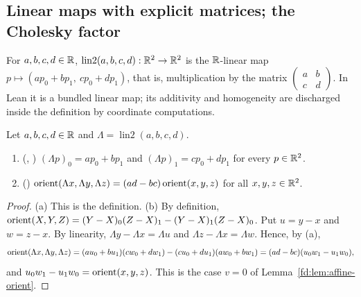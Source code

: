 \subsection{Linear maps with explicit matrices; the Cholesky factor}

\begin{definition}\label{ar:def:lin2}
For $a,b,c,d\in\mathbb R$, $\operatorname{lin2}(a,b,c,d):\mathbb R^2\to\mathbb R^2$ is the $\mathbb R$-linear map
$p\mapsto(ap_0+bp_1,\ cp_0+dp_1)$, that is, multiplication by the matrix
$\begin{pmatrix}a&b\\c&d\end{pmatrix}$. In Lean it is a bundled linear map; its additivity and homogeneity are
discharged inside the definition by coordinate computations.
\end{definition}

\begin{lemma}\label{ar:lem:lin2}
Let $a,b,c,d\in\mathbb R$ and $\Lambda=\operatorname{lin2}(a,b,c,d)$.
\begin{enumerate}[label=\textup{(\alph*)}]
\item \textup{(}, \textup{)} $(\Lambda p)_0=ap_0+bp_1$ and $(\Lambda p)_1=cp_0+dp_1$ for
every $p\in\mathbb R^2$.
\item \textup{(}\textup{)} $\operatorname{orient}(\Lambda x,\Lambda y,\Lambda z)=(ad-bc)\operatorname{orient}(x,y,z)$ for all
$x,y,z\in\mathbb R^2$.
\end{enumerate}
\end{lemma}

\begin{proof}
(a) This is the definition. (b) By definition, $\operatorname{orient}(X,Y,Z)=(Y-X)_0(Z-X)_1-(Y-X)_1(Z-X)_0$. Put $u=y-x$ and $w=z-x$.
By linearity, $\Lambda y-\Lambda x=\Lambda u$ and $\Lambda z-\Lambda x=\Lambda w$. Hence, by (a),
\[
\operatorname{orient}(\Lambda x,\Lambda y,\Lambda z)=(au_0+bu_1)(cw_0+dw_1)-(cu_0+du_1)(aw_0+bw_1)=(ad-bc)(u_0w_1-u_1w_0),
\]
and $u_0w_1-u_1w_0=\operatorname{orient}(x,y,z)$. This is the case $v=0$ of Lemma~\ref{fd:lem:affine-orient}.
\end{proof}

